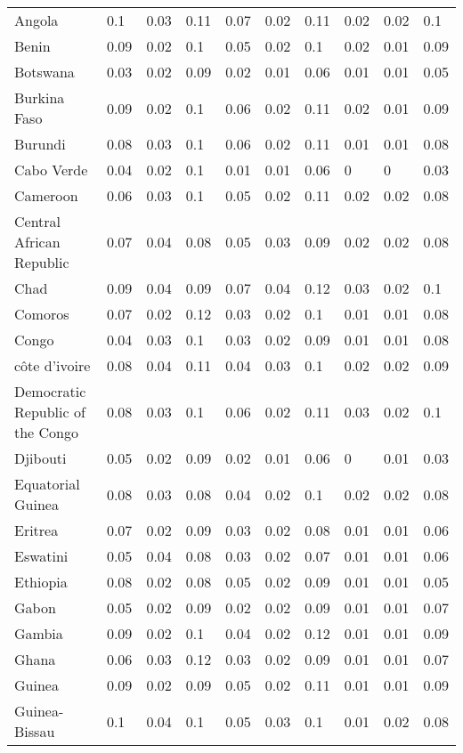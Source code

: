 \begin{longtable}[t]{llllllllll}
Angola & 0.1 & 0.03 & 0.11 & 0.07 & 0.02 & 0.11 & 0.02 & 0.02 & 0.1\\
Benin & 0.09 & 0.02 & 0.1 & 0.05 & 0.02 & 0.1 & 0.02 & 0.01 & 0.09\\
Botswana & 0.03 & 0.02 & 0.09 & 0.02 & 0.01 & 0.06 & 0.01 & 0.01 & 0.05\\
Burkina Faso & 0.09 & 0.02 & 0.1 & 0.06 & 0.02 & 0.11 & 0.02 & 0.01 & 0.09\\
Burundi & 0.08 & 0.03 & 0.1 & 0.06 & 0.02 & 0.11 & 0.01 & 0.01 & 0.08\\
Cabo Verde & 0.04 & 0.02 & 0.1 & 0.01 & 0.01 & 0.06 & 0 & 0 & 0.03\\
Cameroon & 0.06 & 0.03 & 0.1 & 0.05 & 0.02 & 0.11 & 0.02 & 0.02 & 0.08\\
Central African Republic & 0.07 & 0.04 & 0.08 & 0.05 & 0.03 & 0.09 & 0.02 & 0.02 & 0.08\\
Chad & 0.09 & 0.04 & 0.09 & 0.07 & 0.04 & 0.12 & 0.03 & 0.02 & 0.1\\
Comoros & 0.07 & 0.02 & 0.12 & 0.03 & 0.02 & 0.1 & 0.01 & 0.01 & 0.08\\
Congo & 0.04 & 0.03 & 0.1 & 0.03 & 0.02 & 0.09 & 0.01 & 0.01 & 0.08\\
côte d'ivoire & 0.08 & 0.04 & 0.11 & 0.04 & 0.03 & 0.1 & 0.02 & 0.02 & 0.09\\
Democratic Republic of the Congo & 0.08 & 0.03 & 0.1 & 0.06 & 0.02 & 0.11 & 0.03 & 0.02 & 0.1\\
Djibouti & 0.05 & 0.02 & 0.09 & 0.02 & 0.01 & 0.06 & 0 & 0.01 & 0.03\\
Equatorial Guinea & 0.08 & 0.03 & 0.08 & 0.04 & 0.02 & 0.1 & 0.02 & 0.02 & 0.08\\
Eritrea & 0.07 & 0.02 & 0.09 & 0.03 & 0.02 & 0.08 & 0.01 & 0.01 & 0.06\\
Eswatini & 0.05 & 0.04 & 0.08 & 0.03 & 0.02 & 0.07 & 0.01 & 0.01 & 0.06\\
Ethiopia & 0.08 & 0.02 & 0.08 & 0.05 & 0.02 & 0.09 & 0.01 & 0.01 & 0.05\\
Gabon & 0.05 & 0.02 & 0.09 & 0.02 & 0.02 & 0.09 & 0.01 & 0.01 & 0.07\\
Gambia & 0.09 & 0.02 & 0.1 & 0.04 & 0.02 & 0.12 & 0.01 & 0.01 & 0.09\\
Ghana & 0.06 & 0.03 & 0.12 & 0.03 & 0.02 & 0.09 & 0.01 & 0.01 & 0.07\\
Guinea & 0.09 & 0.02 & 0.09 & 0.05 & 0.02 & 0.11 & 0.01 & 0.01 & 0.09\\
Guinea-Bissau & 0.1 & 0.04 & 0.1 & 0.05 & 0.03 & 0.1 & 0.01 & 0.02 & 0.08\\

\end{longtable}
